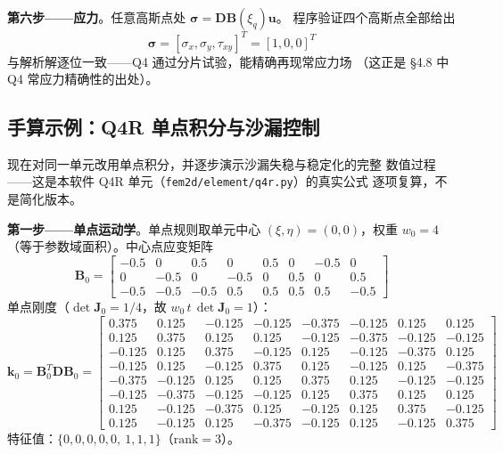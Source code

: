 \documentclass[12pt,a4paper]{ctexart}
\newcommand{\fem}{\Verb}
\begin{document}
\textbf{第六步——应力}。任意高斯点处
$\boldsymbol{\sigma} = \mathbf{D}\mathbf{B}(\xi_q)\mathbf{u}$。
程序验证四个高斯点全部给出
\begin{equation}
\boldsymbol{\sigma} = [\sigma_x,\sigma_y,\tau_{xy}]^T = [1, 0, 0]^T
\end{equation}
与解析解逐位一致——Q4 通过分片试验，能精确再现常应力场
（这正是 §4.8 中 Q4 常应力精确性的出处）。

\subsection{手算示例：Q4R 单点积分与沙漏控制}

现在对同一单元改用单点积分，并逐步演示沙漏失稳与稳定化的完整
数值过程——这是本软件 Q4R 单元（\fem|fem2d/element/q4r.py|）的真实公式
逐项复算，不是简化版本。

\textbf{第一步——单点运动学}。单点规则取单元中心
$(\xi,\eta)=(0,0)$，权重 $w_0=4$（等于参数域面积）。中心点应变矩阵
\begin{equation}
\mathbf{B}_0 = \begin{bmatrix}
-0.5 & 0 & 0.5 & 0 & 0.5 & 0 & -0.5 & 0 \\
0 & -0.5 & 0 & -0.5 & 0 & 0.5 & 0 & 0.5 \\
-0.5 & -0.5 & -0.5 & 0.5 & 0.5 & 0.5 & 0.5 & -0.5
\end{bmatrix}
\end{equation}
单点刚度（$\det\mathbf{J}_0=1/4$，故 $w_0\,t\,\det\mathbf{J}_0 = 1$）：
{\small\begin{equation}
\mathbf{k}_0 = \mathbf{B}_0^T \mathbf{D} \mathbf{B}_0 = \begin{bmatrix}
0.375 & 0.125 & -0.125 & -0.125 & -0.375 & -0.125 & 0.125 & 0.125 \\
0.125 & 0.375 & 0.125 & 0.125 & -0.125 & -0.375 & -0.125 & -0.125 \\
-0.125 & 0.125 & 0.375 & -0.125 & 0.125 & -0.125 & -0.375 & 0.125 \\
-0.125 & 0.125 & -0.125 & 0.375 & 0.125 & -0.125 & 0.125 & -0.375 \\
-0.375 & -0.125 & 0.125 & 0.125 & 0.375 & 0.125 & -0.125 & -0.125 \\
-0.125 & -0.375 & -0.125 & -0.125 & 0.125 & 0.375 & 0.125 & 0.125 \\
0.125 & -0.125 & -0.375 & 0.125 & -0.125 & 0.125 & 0.375 & -0.125 \\
0.125 & -0.125 & 0.125 & -0.375 & -0.125 & 0.125 & -0.125 & 0.375
\end{bmatrix}
\end{equation}}
特征值：$\{0, 0, 0, 0, 0,\ 1, 1, 1\}$（$\mathrm{rank}=3$）。
\end{document}
